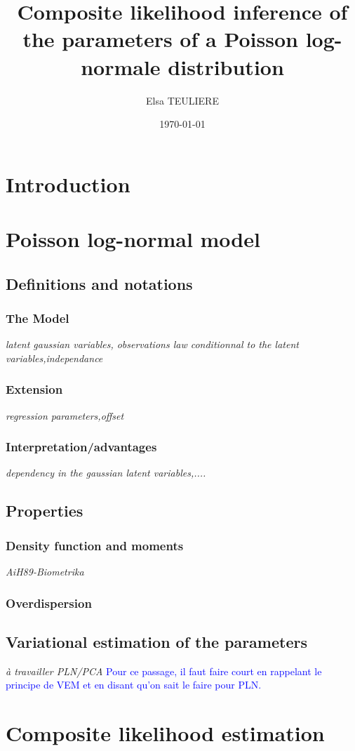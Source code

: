 \documentclass[11pt, a4paper]{article}
\title{	
Composite likelihood inference of the parameters of a Poisson log-normale distribution
}
\date{\today}
\author{Elsa TEULIERE}
\newcommand{\SR}[2]{\textcolor{gray}{#1}\textcolor{blue}{#2}}
\begin{document}
\maketitle
\vspace{1cm}
\section*{Introduction}
\section{Poisson log-normal model}
\subsection{Definitions and notations}
\subsubsection{The Model}
\textit{latent gaussian variables, observations law conditionnal to the latent variables,independance}
\subsubsection{Extension}
\textit{regression parameters,offset}
\subsubsection{Interpretation/advantages}
\textit{dependency in the gaussian latent variables,.... }
\subsection{Properties}
\subsubsection{Density function and moments}
\textit{AiH89-Biometrika}
\subsubsection{Overdispersion}
\subsection{Variational estimation of the parameters}
\textit{\`a travailler PLN/PCA}
\SR{}{Pour ce passage, il faut faire court en rappelant le principe de VEM et en disant qu'on sait le faire pour PLN.}
\section{Composite likelihood estimation}
\end{document}
